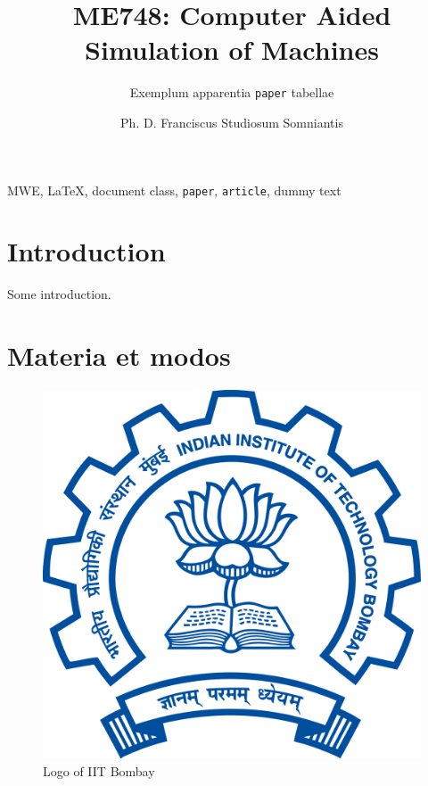 \documentclass[a4paper,latin,center,twocolumn]{paper}
\title{ME748: Computer Aided Simulation of Machines}
\subtitle{Exemplum apparentia \texttt{paper} tabellae}
\author{Ph. D. Franciscus Studiosum Somniantis}
\begin{document}
 
\twocolumn[\maketitle 
    \hrule 
    \bigskip
]

\begin{abstract} 
    {\lipsum[12]} 
\end{abstract}

\begin{keywords}
    \raggedright MWE, \LaTeX, document class, \texttt{paper}, \texttt{article}, dummy text    
\end{keywords}

\smalltableofcontents

\section{Introduction} 
    Some introduction. \lipsum[2]
    
    
\section{Materia et modos} 
    \begin{figure}[hbt!]
        \centering
        \includegraphics[width=0.9\columnwidth]{Images/Indian_Institute_of_Technology_Bombay_Logo.png}
        \caption{Logo of IIT Bombay}
        \label{fig:IITBLogo}
    \end{figure}
\end{document}

